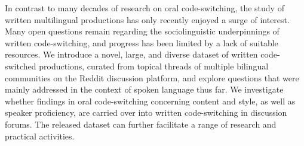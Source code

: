 In contrast to many decades of research on oral code-switching, the study of written multilingual productions has only recently enjoyed a surge of interest.  Many open questions remain regarding the sociolinguistic underpinnings of written code-switching, and progress has been limited by a lack of suitable resources. We introduce a novel, large, and diverse dataset of written code-switched productions, curated from topical threads of multiple bilingual communities on the Reddit discussion platform, and explore questions that were mainly addressed in the context of spoken language thus far. We investigate whether findings in oral code-switching concerning content and style, as well as speaker proficiency, are carried over into written code-switching in discussion forums. The released dataset can further facilitate a range of research and practical activities.